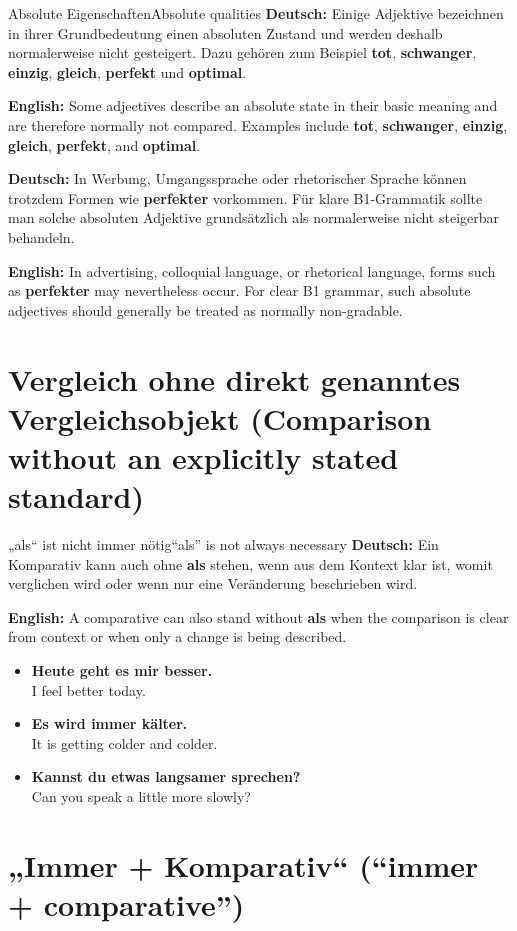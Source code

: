 \documentclass[a4paper,11pt]{article}
\newcommand{\GermanText}[1]{\textbf{Deutsch: }#1\par}
\newcommand{\EnglishText}[1]{{\small\color{SoftGray}\textbf{English: }#1\par}}
\newcommand{\ExampleItem}[2]{\item \textbf{#1}\\{\small\color{SoftGray}#2}}
\begin{document}
\begin{grammarentry}{Absolute Eigenschaften}{Absolute qualities}
\GermanText{Einige Adjektive bezeichnen in ihrer Grundbedeutung einen absoluten Zustand und werden deshalb normalerweise nicht gesteigert. Dazu gehören zum Beispiel \textbf{tot}, \textbf{schwanger}, \textbf{einzig}, \textbf{gleich}, \textbf{perfekt} und \textbf{optimal}.}
\EnglishText{Some adjectives describe an absolute state in their basic meaning and are therefore normally not compared. Examples include \textbf{tot}, \textbf{schwanger}, \textbf{einzig}, \textbf{gleich}, \textbf{perfekt}, and \textbf{optimal}.}

\GermanText{In Werbung, Umgangssprache oder rhetorischer Sprache können trotzdem Formen wie \textbf{perfekter} vorkommen. Für klare B1-Grammatik sollte man solche absoluten Adjektive grundsätzlich als normalerweise nicht steigerbar behandeln.}
\EnglishText{In advertising, colloquial language, or rhetorical language, forms such as \textbf{perfekter} may nevertheless occur. For clear B1 grammar, such absolute adjectives should generally be treated as normally non-gradable.}
\end{grammarentry}

\section{Vergleich ohne direkt genanntes Vergleichsobjekt \textnormal{(Comparison without an explicitly stated standard)}}

\begin{grammarentry}{„als“ ist nicht immer nötig}{“als” is not always necessary}
\GermanText{Ein Komparativ kann auch ohne \textbf{als} stehen, wenn aus dem Kontext klar ist, womit verglichen wird oder wenn nur eine Veränderung beschrieben wird.}
\EnglishText{A comparative can also stand without \textbf{als} when the comparison is clear from context or when only a change is being described.}
\end{grammarentry}

\begin{exbox}
\begin{itemize}
\ExampleItem{Heute geht es mir besser.}{I feel better today.}
\ExampleItem{Es wird immer kälter.}{It is getting colder and colder.}
\ExampleItem{Kannst du etwas langsamer sprechen?}{Can you speak a little more slowly?}
\end{itemize}
\end{exbox}

\section{„Immer + Komparativ“ \textnormal{(“immer + comparative”)}}
\end{document}
